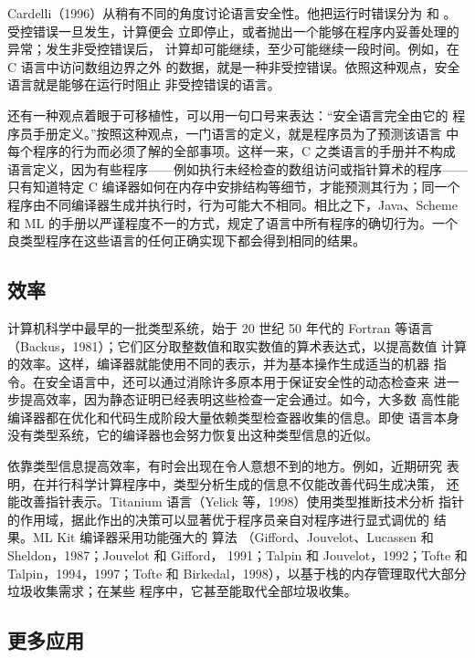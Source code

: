 Cardelli（1996）从稍有不同的角度讨论语言安全性。他把运行时错误分为
和
。受控错误一旦发生，计算便会
立即停止，或者抛出一个能够在程序内妥善处理的异常；发生非受控错误后，
计算却可能继续，至少可能继续一段时间。例如，在 C 语言中访问数组边界之外
的数据，就是一种非受控错误。依照这种观点，安全语言就是能够在运行时阻止
非受控错误的语言。

还有一种观点着眼于可移植性，可以用一句口号来表达：“安全语言完全由它的
程序员手册定义。”按照这种观点，一门语言的定义，就是程序员为了预测该语言
中每个程序的行为而必须了解的全部事项。这样一来，C 之类语言的手册并不构成
语言定义，因为有些程序——例如执行未经检查的数组访问或指针算术的程序——
只有知道特定 C 编译器如何在内存中安排结构等细节，才能预测其行为；同一个
程序由不同编译器生成并执行时，行为可能大不相同。相比之下，Java、Scheme
和 ML 的手册以严谨程度不一的方式，规定了语言中所有程序的确切行为。一个
良类型程序在这些语言的任何正确实现下都会得到相同的结果。

\subsection*{效率}

计算机科学中最早的一批类型系统，始于 20 世纪 50 年代的 Fortran 等语言
（Backus，1981）；它们区分取整数值和取实数值的算术表达式，以提高数值
计算的效率。这样，编译器就能使用不同的表示，并为基本操作生成适当的机器
指令。在安全语言中，还可以通过消除许多原本用于保证安全性的动态检查来
进一步提高效率，因为静态证明已经表明这些检查一定会通过。如今，大多数
高性能编译器都在优化和代码生成阶段大量依赖类型检查器收集的信息。即使
语言本身没有类型系统，它的编译器也会努力恢复出这种类型信息的近似。

依靠类型信息提高效率，有时会出现在令人意想不到的地方。例如，近期研究
表明，在并行科学计算程序中，类型分析生成的信息不仅能改善代码生成决策，
还能改善指针表示。Titanium 语言（Yelick 等，1998）使用类型推断技术分析
指针的作用域，据此作出的决策可以显著优于程序员亲自对程序进行显式调优的
结果。ML Kit 编译器采用功能强大的
算法
（Gifford、Jouvelot、Lucassen 和 Sheldon，1987；Jouvelot 和 Gifford，
1991；Talpin 和 Jouvelot，1992；Tofte 和 Talpin，1994，1997；Tofte 和
Birkedal，1998），以基于栈的内存管理取代大部分垃圾收集需求；在某些
程序中，它甚至能取代全部垃圾收集。

\subsection*{更多应用}

